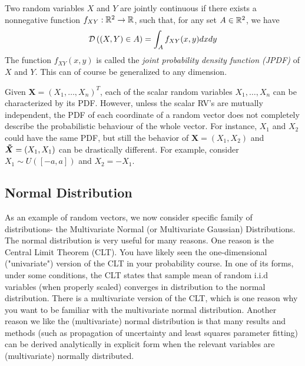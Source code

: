 {\begin{definition}
\end{definition}


\begin{definition}
Two random variables $X$ and $Y$ are jointly continuous if there exists a nonnegative function $f_{XY}: \mathbb{R}^2 \to \mathbb{R}$, such that, for any set $A \in \mathbb{R}^2$, we have
$$
\mathcal{D}\left( (X,Y) \in A \right) = \int_A f_{XY}(x, y) dx dy
$$
The function $f_{XY}(x, y)$ is called the \emph{joint probability density function (JPDF)} of $X$ and $Y$.
This can of course be generalized to any dimension. 

\end{definition}

\begin{remark}
Given $\boldsymbol{X} = (X_1, \dots, X_n)^T$, each of the scalar random variables $X_1, \dots, X_n$ can be characterized by its PDF. However, unless the scalar RV's are mutually independent, the PDF of each coordinate of a random vector does not completely describe the probabilistic behaviour of the whole vector. For instance, $X_1$ and $X_2$ could have the same PDF, but still the behavior of $\boldsymbol{X} = (X_1, X_2)$ and $\boldsymbol{\Tilde{X}} = (X_1, X_1)$ can be drastically different. For example, consider $X_1 \sim U([-a, a])$ and $X_2 = - X_1$. 

\end{remark}



\subsection{Normal Distribution}
As an example of random vectors, we now consider specific family of distributions- the Multivariate Normal (or Multivariate Gaussian) Distributions. The normal distribution is very useful for many reasons. One reason is the Central Limit Theorem (CLT). You have likely seen the one-dimensional ("univariate") version of the CLT in your probability course. In one of its forms, under some conditions, the CLT states that sample mean of random i.i.d variables (when properly scaled) converges in distribution to the normal distribution. There is a multivariate version of the CLT, which is one reason why you want to be familiar with the multivariate normal distribution. Another reason we like the (multivariate) normal distribution is that many results and methods (such as propagation of uncertainty and least squares parameter fitting) can be derived analytically in explicit form when the relevant variables are (multivariate) normally distributed.

}
